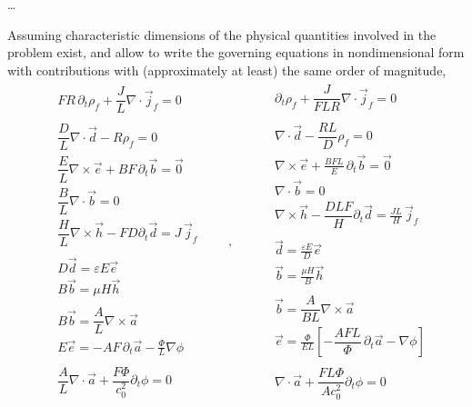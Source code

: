 \documentclass[letterpaper,10pt,english]{jupyterBook}
\begin{document}
\sphinxAtStartPar
…

\sphinxAtStartPar
Assuming characteristic dimensions of the physical quantities involved in the problem exist, and allow to write the governing equations in non\sphinxhyphen{}dimensional form with contributions with (approximately at least) the same order of magnitude,
\begin{equation*}
\begin{split}
\begin{aligned}
   &  F R \, \partial_t \rho_f + \dfrac{J}{L} \nabla \cdot \vec{j}_f = 0 \\ \\
   &  \dfrac{D}{L} \nabla \cdot \vec{d} - R \rho_f = 0 \\
   &  \dfrac{E}{L} \nabla \times \vec{e} + {B F} \, \partial_t \vec{b} = \vec{0} \\ 
   &  \dfrac{B}{L} \nabla \cdot \vec{b} = 0 \\
   &  \dfrac{H}{L} \nabla \times \vec{h} - F D \partial_t \vec{d} = J \, \vec{j}_f  \\ \\
   &  D \vec{d} = \varepsilon E \vec{e} \\
   &  B \vec{b} = \mu H \vec{h} \\ \\
   &  B \vec{b} = \dfrac{A}{L} \nabla \times \vec{a} \\
   &  E \vec{e} = - A F \, \partial_t \vec{a} - \frac{\Phi}{L} \nabla \phi \\ \\
   & \dfrac{A}{L} \nabla \cdot \vec{a} + \dfrac{F \Phi}{c_0^2} \partial_t \phi = 0
\end{aligned}
\qquad , \qquad
\begin{aligned}
   &  \partial_t \rho_f + \dfrac{J}{F L R} \nabla \cdot \vec{j}_f = 0 \\ \\
   &  \nabla \cdot \vec{d} - \dfrac{R L}{D} \rho_f = 0 \\
   &  \nabla \times \vec{e} + \frac{B F L}{E} \, \partial_t \vec{b} = \vec{0} \\ 
   &  \nabla \cdot \vec{b} = 0 \\
   &  \nabla \times \vec{h} - \dfrac{D L F}{H} \partial_t \vec{d} = \frac{J L}{H} \, \vec{j}_f  \\ \\
   &  \vec{d} = \frac{\varepsilon E}{D} \vec{e} \\
   &  \vec{b} = \frac{\mu H}{B} \vec{h} \\ \\
   &  \vec{b} = \dfrac{A}{B L} \nabla \times \vec{a} \\
   &  \vec{e} = \frac{\Phi}{E L} \left[ - \dfrac{A FL}{\Phi} \, \partial_t \vec{a} - \nabla \phi \right] \\ \\
   &  \nabla \cdot \vec{a} + \dfrac{F L \Phi}{A c_0^2} \partial_t \phi = 0
\end{aligned}
\end{split}
\end{equation*}
\end{document}
